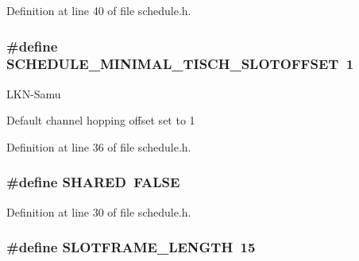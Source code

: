 Definition at line 40 of file schedule.\+h.

\subsubsection[{\texorpdfstring{S\+C\+H\+E\+D\+U\+L\+E\+\_\+\+M\+I\+N\+I\+M\+A\+L\+\_\+6\+T\+I\+S\+C\+H\+\_\+\+S\+L\+O\+T\+O\+F\+F\+S\+ET}{SCHEDULE_MINIMAL_6TISCH_SLOTOFFSET}}]{\setlength{\rightskip}{0pt plus 5cm}\#define S\+C\+H\+E\+D\+U\+L\+E\+\_\+\+M\+I\+N\+I\+M\+A\+L\+\_\+T\+I\+S\+C\+H\+\_\+\+S\+L\+O\+T\+O\+F\+F\+S\+ET~1}\hypertarget{group___schedule_ga62c64cb1c9bbbb2927f358c14535fb7f}{}\label{group___schedule_ga62c64cb1c9bbbb2927f358c14535fb7f}
\begin{DoxyRefDesc}{L\+K\+N-\/\+Samu}
\item[\hyperlink{_l_k_n_code_edits__LKN_code_edits000026}{L\+K\+N-\/\+Samu}]Default channel hopping offset set to 1 \end{DoxyRefDesc}


Definition at line 36 of file schedule.\+h.

\subsubsection[{\texorpdfstring{S\+H\+A\+R\+ED}{SHARED}}]{\setlength{\rightskip}{0pt plus 5cm}\#define S\+H\+A\+R\+ED~{\bf F\+A\+L\+SE}}\hypertarget{group___schedule_ga884c794595c4aa480df9022648c29564}{}\label{group___schedule_ga884c794595c4aa480df9022648c29564}


Definition at line 30 of file schedule.\+h.

\subsubsection[{\texorpdfstring{S\+L\+O\+T\+F\+R\+A\+M\+E\+\_\+\+L\+E\+N\+G\+TH}{SLOTFRAME_LENGTH}}]{\setlength{\rightskip}{0pt plus 5cm}\#define S\+L\+O\+T\+F\+R\+A\+M\+E\+\_\+\+L\+E\+N\+G\+TH~15}\hypertarget{group___schedule_gaea12b586ec3f6de3ffcfff93da574345}{}\label{group___schedule_gaea12b586ec3f6de3ffcfff93da574345}


